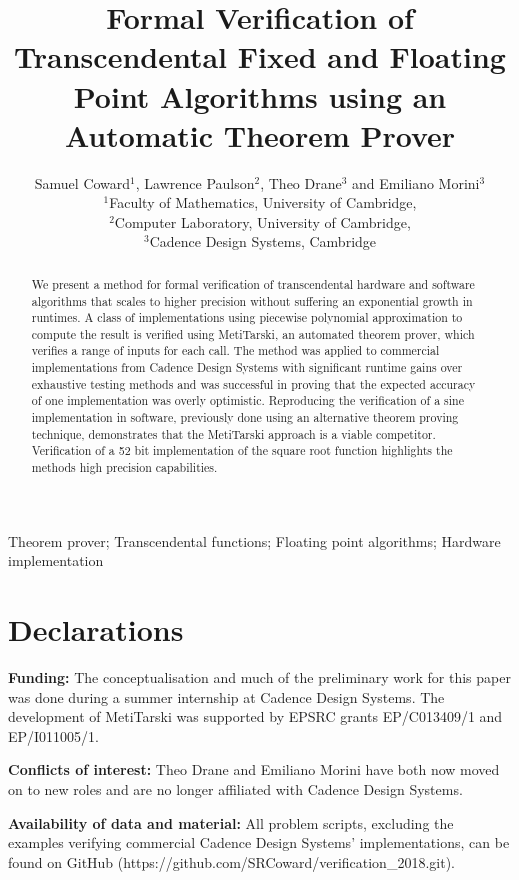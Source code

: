 \documentclass{fac}
\title[Transcendental Verification using Theorem Proving]{Formal Verification of Transcendental Fixed and Floating Point Algorithms using an Automatic Theorem Prover}
\author[Samuel Coward]
    {Samuel Coward$^1$, Lawrence Paulson$^2$, Theo Drane$^3$ and Emiliano Morini$^3$\\
     $^1$Faculty of Mathematics, University of Cambridge,\\
     $^2$Computer Laboratory, University of Cambridge,\\
     $^3$Cadence Design Systems, Cambridge\\}
\begin{document}
\label{firstpage}

\makecorrespond

\maketitle

\begin{abstract}
We present a method for formal verification of transcendental hardware and software algorithms that scales to higher precision without suffering an exponential growth in runtimes. A class of implementations using piecewise polynomial approximation to compute the result is verified using MetiTarski, an automated theorem prover, which verifies a range of inputs for each call. The method was applied to commercial implementations from Cadence Design Systems with significant runtime gains over exhaustive testing methods and was successful in proving that the expected accuracy of one implementation was overly optimistic. Reproducing the verification of a sine implementation in software, previously done using an alternative theorem proving technique, demonstrates that the MetiTarski approach is a viable competitor. Verification of a 52 bit implementation of the square root function highlights the methods high precision capabilities.  
\end{abstract}
\begin{keywords}Theorem prover; Transcendental functions; Floating point algorithms; Hardware implementation
\end{keywords}

\section*{Declarations}
\textbf{Funding:} The conceptualisation and much of the preliminary work for this paper was done during a summer internship at Cadence Design Systems.
The development of MetiTarski was supported by EPSRC grants EP/C013409/1 and EP/I011005/1.

\noindent\textbf{Conflicts of interest:} Theo Drane and Emiliano Morini have both now moved on to new roles and are no longer affiliated with Cadence Design Systems. 

\noindent\textbf{Availability of data and material:} All problem scripts, excluding the examples verifying commercial Cadence Design Systems' implementations, can be found on GitHub \newline (https://github.com/SRCoward/verification\_2018.git).
\end{document}
